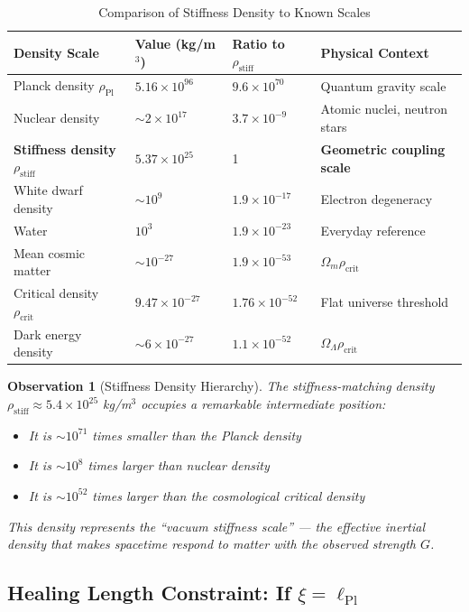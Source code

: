 \documentclass[11pt,a4paper]{article}
\newcommand{\ee}[1]{\times 10^{#1}}
\newcommand{\lPl}{\ensuremath{\ell_{\mathrm{Pl}}}}
\newcommand{\rhocrit}{\ensuremath{\rho_{\mathrm{crit}}}}
\newcommand{\rhostiff}{\ensuremath{\rho_{\mathrm{stiff}}}}
\newcommand{\rhoPl}{\ensuremath{\rho_{\mathrm{Pl}}}}
\newtheorem{observation}{Observation}
\theoremstyle{definition}
\begin{document}
\begin{table}[H]
\centering
\caption{Comparison of Stiffness Density to Known Scales}
\label{tab:density_comparison}
\begin{tabular}{@{}llll@{}}
\toprule
\textbf{Density Scale} & \textbf{Value (kg/m$^3$)} & \textbf{Ratio to $\rhostiff$} & \textbf{Physical Context} \\
\midrule
Planck density $\rhoPl$ & $5.16 \ee{96}$ & $9.6 \ee{70}$ & Quantum gravity scale \\
Nuclear density & $\sim 2 \ee{17}$ & $3.7 \ee{-9}$ & Atomic nuclei, neutron stars \\
\textbf{Stiffness density} $\rhostiff$ & $5.37 \ee{25}$ & 1 & \textbf{Geometric coupling scale} \\
White dwarf density & $\sim 10^{9}$ & $1.9 \ee{-17}$ & Electron degeneracy \\
Water & $10^{3}$ & $1.9 \ee{-23}$ & Everyday reference \\
Mean cosmic matter & $\sim 10^{-27}$ & $1.9 \ee{-53}$ & $\Omega_m \rhocrit$ \\
Critical density $\rhocrit$ & $9.47 \ee{-27}$ & $1.76 \ee{-52}$ & Flat universe threshold \\
Dark energy density & $\sim 6 \ee{-27}$ & $1.1 \ee{-52}$ & $\Omega_\Lambda \rhocrit$ \\
\bottomrule
\end{tabular}
\end{table}

\begin{observation}[Stiffness Density Hierarchy]
The stiffness-matching density $\rhostiff \approx 5.4 \ee{25}$ kg/m$^3$ occupies a remarkable intermediate position:
\begin{itemize}
    \item It is $\sim 10^{71}$ times \emph{smaller} than the Planck density
    \item It is $\sim 10^{8}$ times \emph{larger} than nuclear density
    \item It is $\sim 10^{52}$ times \emph{larger} than the cosmological critical density
\end{itemize}
This density represents the ``vacuum stiffness scale'' --- the effective inertial density that makes spacetime respond to matter with the observed strength $G$.
\end{observation}

\subsection{Healing Length Constraint: If $\xi = \lPl$}
\label{sec:healing_planck}
\end{document}
